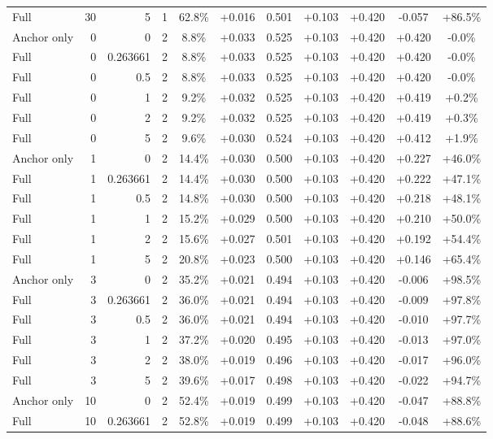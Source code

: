 \begin{table}[htbp]
\begin{tabular}{lrrrccccccc}
Full & 30 & 5 & 1 & 62.8\% & +0.016 & 0.501 & +0.103 & +0.420 & -0.057 & +86.5\% \\
Anchor only & 0 & 0 & 2 & 8.8\% & +0.033 & 0.525 & +0.103 & +0.420 & +0.420 & -0.0\% \\
Full & 0 & 0.263661 & 2 & 8.8\% & +0.033 & 0.525 & +0.103 & +0.420 & +0.420 & -0.0\% \\
Full & 0 & 0.5 & 2 & 8.8\% & +0.033 & 0.525 & +0.103 & +0.420 & +0.420 & -0.0\% \\
Full & 0 & 1 & 2 & 9.2\% & +0.032 & 0.525 & +0.103 & +0.420 & +0.419 & +0.2\% \\
Full & 0 & 2 & 2 & 9.2\% & +0.032 & 0.525 & +0.103 & +0.420 & +0.419 & +0.3\% \\
Full & 0 & 5 & 2 & 9.6\% & +0.030 & 0.524 & +0.103 & +0.420 & +0.412 & +1.9\% \\
Anchor only & 1 & 0 & 2 & 14.4\% & +0.030 & 0.500 & +0.103 & +0.420 & +0.227 & +46.0\% \\
Full & 1 & 0.263661 & 2 & 14.4\% & +0.030 & 0.500 & +0.103 & +0.420 & +0.222 & +47.1\% \\
Full & 1 & 0.5 & 2 & 14.8\% & +0.030 & 0.500 & +0.103 & +0.420 & +0.218 & +48.1\% \\
Full & 1 & 1 & 2 & 15.2\% & +0.029 & 0.500 & +0.103 & +0.420 & +0.210 & +50.0\% \\
Full & 1 & 2 & 2 & 15.6\% & +0.027 & 0.501 & +0.103 & +0.420 & +0.192 & +54.4\% \\
Full & 1 & 5 & 2 & 20.8\% & +0.023 & 0.500 & +0.103 & +0.420 & +0.146 & +65.4\% \\
Anchor only & 3 & 0 & 2 & 35.2\% & +0.021 & 0.494 & +0.103 & +0.420 & -0.006 & +98.5\% \\
Full & 3 & 0.263661 & 2 & 36.0\% & +0.021 & 0.494 & +0.103 & +0.420 & -0.009 & +97.8\% \\
Full & 3 & 0.5 & 2 & 36.0\% & +0.021 & 0.494 & +0.103 & +0.420 & -0.010 & +97.7\% \\
Full & 3 & 1 & 2 & 37.2\% & +0.020 & 0.495 & +0.103 & +0.420 & -0.013 & +97.0\% \\
Full & 3 & 2 & 2 & 38.0\% & +0.019 & 0.496 & +0.103 & +0.420 & -0.017 & +96.0\% \\
Full & 3 & 5 & 2 & 39.6\% & +0.017 & 0.498 & +0.103 & +0.420 & -0.022 & +94.7\% \\
Anchor only & 10 & 0 & 2 & 52.4\% & +0.019 & 0.499 & +0.103 & +0.420 & -0.047 & +88.8\% \\
Full & 10 & 0.263661 & 2 & 52.8\% & +0.019 & 0.499 & +0.103 & +0.420 & -0.048 & +88.6\% \\

\end{tabular}
\end{table}
